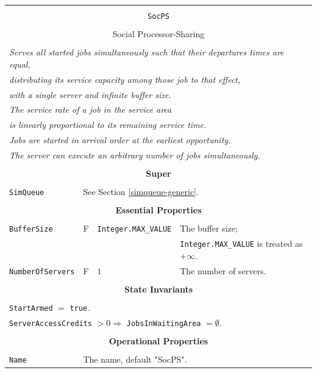 \documentclass[12pt]{book}
\begin{document}
\begin{tabular}{|l|l|l|l|}
\hline
\multicolumn{4}{|c|}{} \\
\multicolumn{4}{|c|}{\lstinline[basicstyle=\large]{SocPS}} \\
\multicolumn{4}{|c|}{} \\
\multicolumn{4}{|c|}{Social Processor-Sharing} \\
\multicolumn{4}{|c|}{} \\
\hline
\multicolumn{4}{|l|}{\em Serves all started jobs simultaneously such that their departures times are equal,} \\
\multicolumn{4}{|l|}{\em distributing its service capacity among those job to that effect,} \\
\multicolumn{4}{|l|}{\em with a single server and infinite buffer size.} \\
\multicolumn{4}{|l|}{\em The service rate of a job in the service area} \\
\multicolumn{4}{|l|}{\em is linearly proportional to its remaining service time.} \\
\multicolumn{4}{|l|}{\em Jobs are started in arrival order at the earliest opportunity.} \\
\multicolumn{4}{|l|}{\em The server can execute an arbitrary number of jobs simultaneously.} \\
\hline
\multicolumn{4}{|c|}{} \\
\multicolumn{4}{|c|}{\bf Super} \\
\multicolumn{4}{|c|}{} \\
\hline
\lstinline|SimQueue| & \multicolumn{3}{|l|}{See Section \ref{simqueue-generic}.} \\
\hline
\multicolumn{4}{|c|}{} \\
\multicolumn{4}{|c|}{\bf Essential Properties} \\
\multicolumn{4}{|c|}{} \\
\hline
\lstinline|BufferSize|      & F & \lstinline|Integer.MAX_VALUE|
                            & The buffer size; \\
                        & & & \lstinline|Integer.MAX_VALUE| is treated as $+\infty$. \\
\hline
\lstinline|NumberOfServers|    & F & $1$
                               & The number of servers. \\
\hline
\multicolumn{4}{|c|}{} \\
\multicolumn{4}{|c|}{\bf State  Invariants} \\
\multicolumn{4}{|c|}{} \\
\hline
\multicolumn{4}{|l|}{\lstinline|StartArmed| $=$ \lstinline|true|.} \\
\multicolumn{4}{|l|}{\lstinline|ServerAccessCredits| $> 0 \Rightarrow$ \lstinline|JobsInWaitingArea| $= \emptyset$.} \\
\hline
\multicolumn{4}{|c|}{} \\
\multicolumn{4}{|c|}{\bf Operational Properties} \\
\multicolumn{4}{|c|}{} \\
\hline
\lstinline|Name| & \multicolumn{3}{|l|}{The name, default "SocPS".} \\
\hline
\end{tabular}
\end{document}
